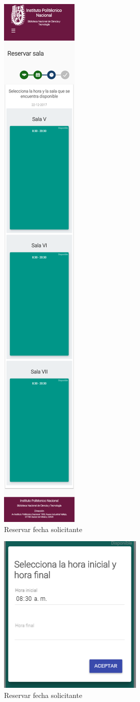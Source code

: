 	
		\begin{figure}
	\includegraphics[scale=0.3]{images/InterfazMovil/IUGS02_reservarHoraSolicitante.png}
		\caption{Reservar fecha solicitante}
	\end{figure}
	
	\begin{figure}
	\includegraphics[scale=0.3]{images/InterfazMovil/IUGS02_reservarHoraEstableSolicitante.png}
		\caption{Reservar fecha solicitante}
	\end{figure}
	